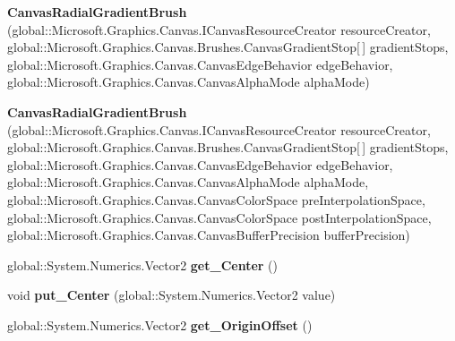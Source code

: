 \begin{DoxyCompactItemize}
{\bfseries Canvas\+Radial\+Gradient\+Brush} (global\+::\+Microsoft.\+Graphics.\+Canvas.\+I\+Canvas\+Resource\+Creator resource\+Creator, global\+::\+Microsoft.\+Graphics.\+Canvas.\+Brushes.\+Canvas\+Gradient\+Stop\mbox{[}$\,$\mbox{]} gradient\+Stops, global\+::\+Microsoft.\+Graphics.\+Canvas.\+Canvas\+Edge\+Behavior edge\+Behavior, global\+::\+Microsoft.\+Graphics.\+Canvas.\+Canvas\+Alpha\+Mode alpha\+Mode)
\item 
\mbox{\label{class_microsoft_1_1_graphics_1_1_canvas_1_1_brushes_1_1_canvas_radial_gradient_brush_a5bcd11137c2799ca1ee5edea427d5ecb}} 
{\bfseries Canvas\+Radial\+Gradient\+Brush} (global\+::\+Microsoft.\+Graphics.\+Canvas.\+I\+Canvas\+Resource\+Creator resource\+Creator, global\+::\+Microsoft.\+Graphics.\+Canvas.\+Brushes.\+Canvas\+Gradient\+Stop\mbox{[}$\,$\mbox{]} gradient\+Stops, global\+::\+Microsoft.\+Graphics.\+Canvas.\+Canvas\+Edge\+Behavior edge\+Behavior, global\+::\+Microsoft.\+Graphics.\+Canvas.\+Canvas\+Alpha\+Mode alpha\+Mode, global\+::\+Microsoft.\+Graphics.\+Canvas.\+Canvas\+Color\+Space pre\+Interpolation\+Space, global\+::\+Microsoft.\+Graphics.\+Canvas.\+Canvas\+Color\+Space post\+Interpolation\+Space, global\+::\+Microsoft.\+Graphics.\+Canvas.\+Canvas\+Buffer\+Precision buffer\+Precision)
\item 
\mbox{\label{class_microsoft_1_1_graphics_1_1_canvas_1_1_brushes_1_1_canvas_radial_gradient_brush_a43413929c2a98e600a2c1dbe5ca5bd5d}} 
global\+::\+System.\+Numerics.\+Vector2 {\bfseries get\+\_\+\+Center} ()
\item 
\mbox{\label{class_microsoft_1_1_graphics_1_1_canvas_1_1_brushes_1_1_canvas_radial_gradient_brush_a8fb60dbea8079a04d895966bf57a6cd4}} 
void {\bfseries put\+\_\+\+Center} (global\+::\+System.\+Numerics.\+Vector2 value)
\item 
\mbox{\label{class_microsoft_1_1_graphics_1_1_canvas_1_1_brushes_1_1_canvas_radial_gradient_brush_a5c218cf977932ca4601e2986eb75f50d}} 
global\+::\+System.\+Numerics.\+Vector2 {\bfseries get\+\_\+\+Origin\+Offset} ()
\item 

\end{DoxyCompactItemize}
